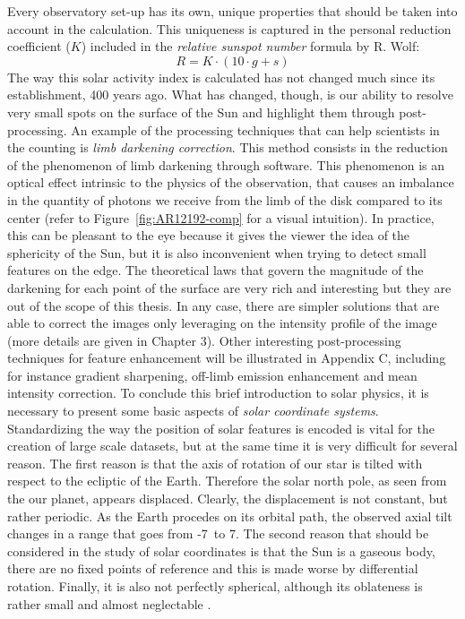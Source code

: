 \bigbreak
\noindent Every observatory set-up has its own, unique properties that should be taken into account in the calculation. This uniqueness is captured in the personal reduction coefficient ($K$) included in the \textit{relative sunspot number} formula by R. Wolf:
\begin{equation}\label{relssnum}
R = K \cdot (10 \cdot g + s)
\end{equation}
The way this solar activity index is calculated has not changed much since its establishment, 400 years ago. What has changed, though, is our ability to resolve very small spots on the surface of the Sun and highlight them through post-processing.
\bigbreak
\noindent An example of the processing techniques that can help scientists in the counting is \textit{limb darkening correction}. This method consists in the reduction of the phenomenon of limb darkening through software. This phenomenon is an optical effect intrinsic to the physics of the observation, that causes an imbalance in the quantity of photons we receive from the limb of the disk compared to its center (refer to Figure~\ref{fig:AR12192-comp} for a visual intuition). In practice, this can be pleasant to the eye because it gives the viewer the idea of the sphericity of the Sun, but it is also inconvenient when trying to detect small features on the edge.
\bigbreak
\noindent The theoretical laws that govern the magnitude of the darkening for each point of the surface are very rich and interesting but they are out of the scope of this thesis. In any case, there are simpler solutions that are able to correct the images only leveraging on the intensity profile of the image (more details are given in Chapter 3). Other interesting post-processing techniques for feature enhancement will be illustrated in Appendix C, including for instance gradient sharpening, off-limb emission enhancement and mean intensity correction.
\bigbreak
\noindent To conclude this brief introduction to solar physics, it is necessary to present some basic aspects of \textit{solar coordinate systems}. Standardizing the way the position of solar features is encoded is vital for the creation of large scale datasets, but at the same time it is very difficult for several reason. The first reason is that the axis of rotation of our star is tilted with respect to the ecliptic of the Earth. Therefore the solar north pole, as seen from the our planet, appears displaced. Clearly, the displacement is not constant, but rather periodic. As the Earth procedes on its orbital path, the observed axial tilt changes in a range that goes from -7\textdegree\ to 7\textdegree. The second reason that should be considered in the study of solar coordinates is that the Sun is a gaseous body, there are no fixed points of reference and this is made worse by differential rotation. Finally, it is also not perfectly spherical, although its oblateness is rather small and almost neglectable \cite{dicke1974oblateness}.
